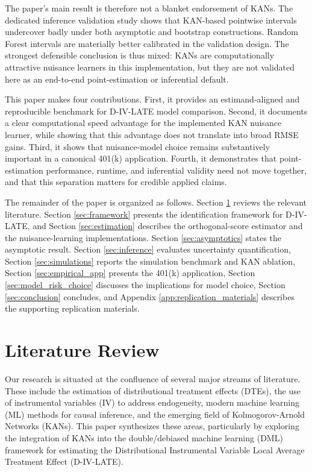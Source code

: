 \documentclass[final,3p,fleqn, 10pt]{elsarticle}
\begin{document}
The paper's main result is therefore not a blanket endorsement of KANs. The dedicated inference validation study shows that KAN-based pointwise intervals undercover badly under both asymptotic and bootstrap constructions. Random Forest intervals are materially better calibrated in the validation design. The strongest defensible conclusion is thus mixed: KANs are computationally attractive nuisance learners in this implementation, but they are not validated here as an end-to-end point-estimation or inferential default.

This paper makes four contributions. First, it provides an estimand-aligned and reproducible benchmark for D-IV-LATE model comparison. Second, it documents a clear computational speed advantage for the implemented KAN nuisance learner, while showing that this advantage does not translate into broad RMSE gains. Third, it shows that nuisance-model choice remains substantively important in a canonical 401(k) application. Fourth, it demonstrates that point-estimation performance, runtime, and inferential validity need not move together, and that this separation matters for credible applied claims.

The remainder of the paper is organized as follows. Section \ref{sec:lit_review} reviews the relevant literature. Section \ref{sec:framework} presents the identification framework for D-IV-LATE, and Section \ref{sec:estimation} describes the orthogonal-score estimator and the nuisance-learning implementations. Section \ref{sec:asymptotics} states the asymptotic result. Section \ref{sec:inference} evaluates uncertainty quantification, Section \ref{sec:simulations} reports the simulation benchmark and KAN ablation, Section \ref{sec:empirical_app} presents the 401(k) application, Section \ref{sec:model_risk_choice} discusses the implications for model choice, Section \ref{sec:conclusion} concludes, and Appendix \ref{app:replication_materials} describes the supporting replication materials.

\section{Literature Review}
\label{sec:lit_review}

Our research is situated at the confluence of several major streams of literature. These include the estimation of distributional treatment effects (DTEs), the use of instrumental variables (IV) to address endogeneity, modern machine learning (ML) methods for causal inference, and the emerging field of Kolmogorov-Arnold Networks (KANs). This paper synthesizes these areas, particularly by exploring the integration of KANs into the double/debiased machine learning (DML) framework for estimating the Distributional Instrumental Variable Local Average Treatment Effect (D-IV-LATE).
\end{document}
